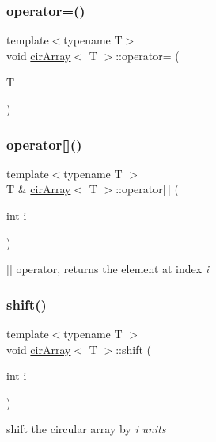 \subsubsection{\texorpdfstring{operator=()}{operator=()}}
{\footnotesize\ttfamily template$<$typename T$>$ \\
void \mbox{\hyperlink{classcirArray}{cir\+Array}}$<$ T $>$\+::operator= (\begin{DoxyParamCaption}\item[{T}]{ }\end{DoxyParamCaption})}

\mbox{\label{classcirArray_a523faf5369bc1dd91750a9106ee2d553}} 
\subsubsection{\texorpdfstring{operator[]()}{operator[]()}}
{\footnotesize\ttfamily template$<$typename T $>$ \\
T \& \mbox{\hyperlink{classcirArray}{cir\+Array}}$<$ T $>$\+::operator\mbox{[}$\,$\mbox{]} (\begin{DoxyParamCaption}\item[{int}]{i }\end{DoxyParamCaption})}

\mbox{[}\mbox{]} operator, returns the element at index {\itshape i} {\itshape } \mbox{\label{classcirArray_a2d6c6f8c6692176f387c44dd53c67e8c}} 
\subsubsection{\texorpdfstring{shift()}{shift()}}
{\footnotesize\ttfamily template$<$typename T $>$ \\
void \mbox{\hyperlink{classcirArray}{cir\+Array}}$<$ T $>$\+::shift (\begin{DoxyParamCaption}\item[{int}]{i }\end{DoxyParamCaption})}

shift the circular array by {\itshape i} {\itshape units} \mbox{\label{classcirArray_a45cd2458054ae24982c2cf816292c1e1}} 
